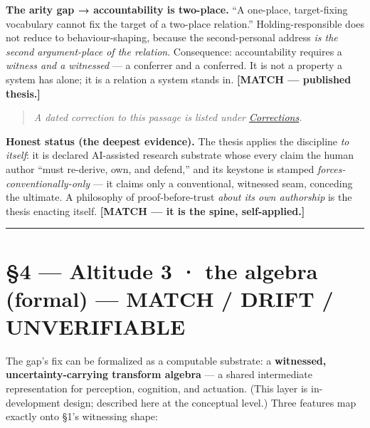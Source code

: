 \documentclass[11pt]{article}
\begin{document}
\textbf{The arity gap → accountability is two-place.} ``A one-place, target-fixing vocabulary cannot fix the target of a two-place relation.'' Holding-responsible does not reduce to behaviour-shaping, because the second-personal address \emph{is the second argument-place of the relation}. Consequence: accountability requires a \emph{witness and a witnessed} — a conferrer and a conferred. It is not a property a system has alone; it is a relation a system stands in. \textbf{[MATCH — published thesis.]}

\begin{quote}\small\emph{A dated correction to this passage is listed under \hyperref[corrections]{Corrections}.}\end{quote}

\textbf{Honest status (the deepest evidence).} The thesis applies the discipline \emph{to itself}: it is declared AI-assisted research substrate whose every claim the human author ``must re-derive, own, and defend,'' and its keystone is stamped \emph{forces-conventionally-only} — it claims only a conventional, witnessed seam, conceding the ultimate. A philosophy of proof-before-trust \emph{about its own authorship} is the thesis enacting itself. \textbf{[MATCH — it is the spine, self-applied.]}

\medskip\noindent\rule{\linewidth}{0.3pt}\medskip

\section*{§4 — Altitude 3 · the algebra (formal) — MATCH /\allowbreak{} DRIFT /\allowbreak{} UNVERIFIABLE}

The gap's fix can be formalized as a computable substrate: a \textbf{witnessed, uncertainty-carrying transform algebra} — a shared intermediate representation for perception, cognition, and actuation. (This layer is in-development design; described here at the conceptual level.) Three features map exactly onto §1's witnessing shape:
\end{document}

